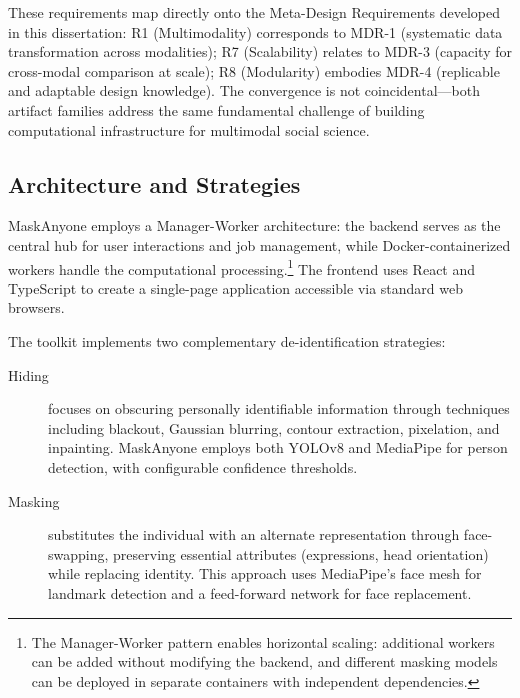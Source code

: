 \documentclass[../main.tex]{subfiles}
\begin{document}
These requirements map directly onto the Meta-Design Requirements developed in this dissertation: R1 (Multimodality) corresponds to MDR-1 (systematic data transformation across modalities); R7 (Scalability) relates to MDR-3 (capacity for cross-modal comparison at scale); R8 (Modularity) embodies MDR-4 (replicable and adaptable design knowledge). The convergence is not coincidental---both artifact families address the same fundamental challenge of building computational infrastructure for multimodal social science.

\subsection{Architecture and Strategies}

MaskAnyone employs a Manager-Worker architecture: the backend serves as the central hub for user interactions and job management, while Docker-containerized workers handle the computational processing.\footnote{The Manager-Worker pattern enables horizontal scaling: additional workers can be added without modifying the backend, and different masking models can be deployed in separate containers with independent dependencies.} The frontend uses React and TypeScript to create a single-page application accessible via standard web browsers.

The toolkit implements two complementary de-identification strategies:

\begin{description}
    \item[Hiding] focuses on obscuring personally identifiable information through techniques including blackout, Gaussian blurring, contour extraction, pixelation, and inpainting. MaskAnyone employs both YOLOv8 and MediaPipe for person detection, with configurable confidence thresholds.
    \item[Masking] substitutes the individual with an alternate representation through face-swapping, preserving essential attributes (expressions, head orientation) while replacing identity. This approach uses MediaPipe's face mesh for landmark detection and a feed-forward network for face replacement.
\end{description}
\end{document}
